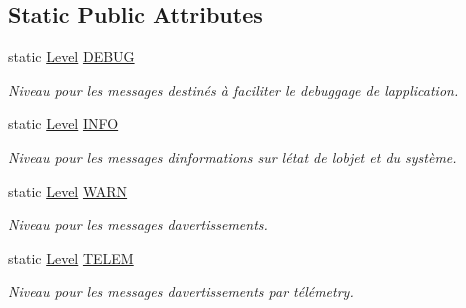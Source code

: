 \subsection*{Static Public Attributes}
\begin{DoxyCompactItemize}
\item 
\mbox{\label{classlogs_1_1Level_a139c20d5b628600369c9420688be574f}} 
static \hyperlink{classlogs_1_1Level}{Level} \hyperlink{classlogs_1_1Level_a139c20d5b628600369c9420688be574f}{D\+E\+B\+UG}
\begin{DoxyCompactList}\small\item\em Niveau pour les messages destinés à faciliter le debuggage de l\textquotesingle{}application. \end{DoxyCompactList}\item 
\mbox{\label{classlogs_1_1Level_a2b2d69562b730d64f0ad733cc1551da4}} 
static \hyperlink{classlogs_1_1Level}{Level} \hyperlink{classlogs_1_1Level_a2b2d69562b730d64f0ad733cc1551da4}{I\+N\+FO}
\begin{DoxyCompactList}\small\item\em Niveau pour les messages d\textquotesingle{}informations sur l\textquotesingle{}état de l\textquotesingle{}objet et du système. \end{DoxyCompactList}\item 
\mbox{\label{classlogs_1_1Level_a3dd740fa554fc4dd1b18fbd092e676cb}} 
static \hyperlink{classlogs_1_1Level}{Level} \hyperlink{classlogs_1_1Level_a3dd740fa554fc4dd1b18fbd092e676cb}{W\+A\+RN}
\begin{DoxyCompactList}\small\item\em Niveau pour les messages d\textquotesingle{}avertissements. \end{DoxyCompactList}\item 
\mbox{\label{classlogs_1_1Level_ab6bdad49503b045faa58fc5da44bf163}} 
static \hyperlink{classlogs_1_1Level}{Level} \hyperlink{classlogs_1_1Level_ab6bdad49503b045faa58fc5da44bf163}{T\+E\+L\+EM}
\begin{DoxyCompactList}\small\item\em Niveau pour les messages d\textquotesingle{}avertissements par télémetry. \end{DoxyCompactList}\item 
\mbox{\label{classlogs_1_1Level_a2ab4cb2da672f44e6cb5ac1de987f8dc}} 

\end{DoxyCompactItemize}
